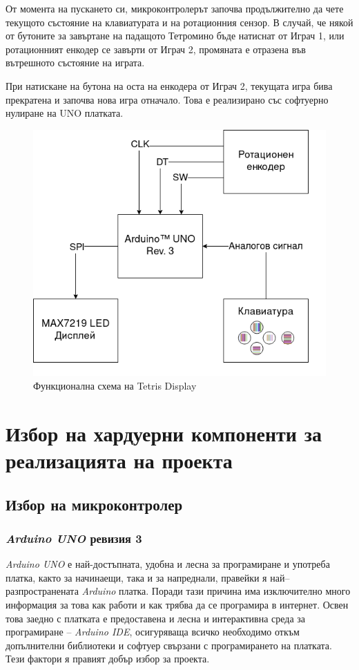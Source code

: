 \documentclass[titlepage, oneside, 12pt]{book}
\newcommand{\ard}{Arduino\texttrademark{}}
\begin{document}
От момента на пускането си, микроконтролерът започва продължително да чете
текущото състояние на клавиатурата и на ротационния сензор. В случай, че някой
от бутоните за завъртане на падащото Тетромино бъде натиснат от Играч 1, или
ротационният енкодер се завърти от Играч 2, промяната е отразена във вътрешното
състояние на играта.

При натискане на бутона на оста на енкодера от Играч 2, текущата игра бива прекратена и
започва нова игра отначало. Това е реализирано със софтуерно нулиране на UNO платката.

\begin{figure}[h!]
    \label{tetrogrid}
    \centering
    \includegraphics[width=0.5\linewidth]{img/functional_diagram.drawio.png}
    \caption{Функционална схема на Tetris Display}
\end{figure}


\section{Избор на хардуерни компоненти за реализацията на проекта}

\subsection{Избор на микроконтролер}

\subsubsection{\textit{\ard{} UNO} ревизия 3}

\textit{\ard{} UNO} \cite{arduino} е най-достъпната, удобна и лесна за програмиране и
употреба платка, както за начинаещи, така и за напреднали, правейки я
най–разпространената \textit{\ard{}} платка. Поради тази причина има
изключително много информация за това как работи и как трябва да се
програмира в интернет. Освен това заедно с платката е предоставена и лесна
и интерактивна среда за програмиране -- \textit{\ard{} IDE}, осигуряваща всичко
необходимо откъм допълнителни библиотеки и софтуер свързани с
програмирането на платката. Тези фактори я правият добър избор за
проекта.
\end{document}

